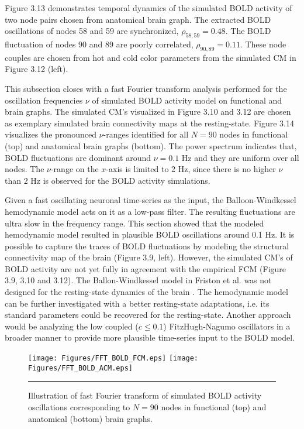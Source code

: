 Figure 3.13 demonstrates temporal dynamics of the simulated BOLD activity of two node pairs chosen from anatomical brain graph. The extracted BOLD oscillations of nodes 58 and 59 are synchronized, $\rho_{58,59}=0.48$. The BOLD fluctuation of nodes 90 and 89 are poorly correlated, $\rho_{90,89}=0.11$. These node couples are chosen from hot and cold color parameters from the simulated CM in Figure 3.12 (left).

This subsection closes with a fast Fourier transform analysis performed for the oscillation frequencies $\nu$ of simulated BOLD activity model on functional and brain graphs. The simulated CM's visualized in Figure 3.10 and 3.12 are chosen as exemplary simulated brain connectivity maps at the resting-state. Figure 3.14 visualizes the pronounced $\nu$-ranges identified for all $N=90$ nodes in functional (top) and anatomical brain graphs (bottom). The power spectrum indicates that, BOLD fluctuations are dominant around $\nu =0.1$ Hz and they are uniform over all nodes. The $\nu$-range on the $x$-axis is limited to 2 Hz, since there is no higher $\nu$ than 2 Hz is observed for the BOLD activity simulations. 

Given a fast oscillating neuronal time-series as the input, the Balloon-Windkessel hemodynamic model \citep{FRI00} acts on it as a low-pass filter. The resulting fluctuations are ultra slow in the frequency range. This section showed that the modeled hemodynamic model resulted in plausible BOLD oscillations around 0.1 Hz. It is possible to capture the traces of BOLD fluctuations by modeling the structural connectivity map of the brain (Figure 3.9, left). However, the simulated CM's of BOLD activity are not yet fully in agreement with the empirical FCM (Figure 3.9, 3.10 and 3.12). The Ballon-Windkessel model in Friston et al. was not designed for the resting-state dynamics of the brain \citep{FRI00}. The hemodynamic model can be further investigated with a better resting-state adaptations, i.e. its standard parameters could be recovered for the resting-state. Another approach would be analyzing the low coupled ($c\leq 0.1$) FitzHugh-Nagumo oscillators in a broader manner to provide more plausible time-series input to the BOLD model.   


\begin{figure}[htbp]
 
  \centering
	 \texttt{[image: Figures/FFT\_BOLD\_FCM.eps]} 
   	 \texttt{[image: Figures/FFT\_BOLD\_ACM.eps]}  

    \rule{35em}{0.5pt}
  \caption[3D Fast Fourier Transform, BOLD, FCM]{Illustration of fast Fourier transform of simulated BOLD activity oscillations corresponding to $N=90$ nodes in functional (top) and anatomical (bottom) brain graphs.  } 
    \label{fig:3D Fast Fourier Transform, BOLD, FCM}
 	
\end{figure}  


